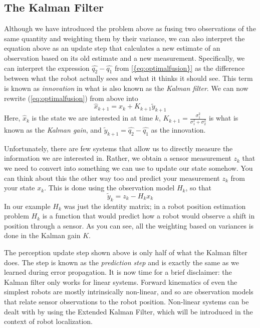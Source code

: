 \subsection{The Kalman Filter}
Although we have introduced the problem above as fusing two observations of the same quantity and weighting them by their variance, we can also interpret the equation above as an update step that calculates a new estimate of an observation based on its old estimate and a new measurement. Specifically, we can interpret the expression $\hat{q_2}-\hat{q_1}$ from \cref{{eq:optimalfusion}} as the difference between what the robot actually sees and what it thinks it should see. This term is known as \textsl{innovation} in what is also known as the \emph{Kalman filter}. We can now
rewrite (\ref{eq:optimalfusion}) from above into
\begin{equation}
\hat{x}_{k+1}=\hat{x}_k+K_{k+1}\tilde{y}_{k+1}
\end{equation}
Here, $ \hat{x}_k$ is the state we are interested in at time $ k$, $ K_{k+1}=\frac{\sigma_1^2}{\sigma_1^2+\sigma_2^2}$ is what is known as the \emph{Kalman gain}, and $ \tilde{y}_{k+1}=\hat{q_2}-\hat{q_1}$  as the innovation.

Unfortunately, there are few systems that allow us to directly measure the information we are interested in. Rather, we obtain a sensor measurement $ z_k$ that we need to convert into something we can use to update our state somehow. You can think about this the other way too and predict your measurement $ z_k$ from your state $ x_k$. This is done using the observation model $ H_k$, so that
\begin{equation}
\tilde{y}_{k}=z_k-H_k x_k
\end{equation}
In our example $ H_k$ was just the identity matrix; in a robot position estimation problem $ H_k$ is a function that would predict how a robot would observe a shift in position through a sensor. As you can see, all the weighting based on variances is done in the Kalman gain $ K$.

The perception update step shown above is only half of what the Kalman filter does. The step is known as the \emph{prediction step} and is exactly the same as we learned during error propagation. It is now time for a brief disclaimer: the Kalman filter only works for linear systems. Forward kinematics of even the simplest robots are mostly intrinsically non-linear, and so are observation models that relate sensor observations to the robot position. Non-linear systems can be dealt with by using the Extended Kalman Filter, which will be introduced in the context of robot localization. %


